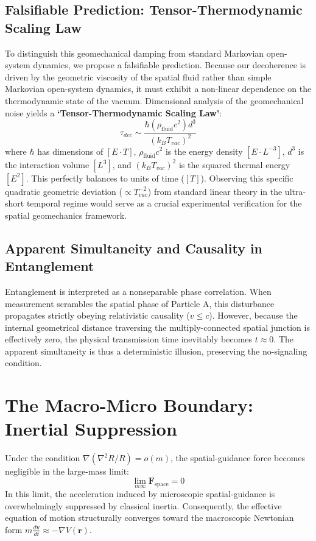 \documentclass[reprint,amsmath,amssymb,aps,prd]{revtex4-2}
\begin{document}
\subsection{Falsifiable Prediction: Tensor-Thermodynamic Scaling Law}
To distinguish this geomechanical damping from standard Markovian open-system dynamics, we propose a falsifiable prediction.
Because our decoherence is driven by the geometric viscosity of the spatial fluid rather than simple Markovian open-system dynamics, it must exhibit a non-linear dependence on the thermodynamic state of the vacuum.
Dimensional analysis of the geomechanical noise yields a \textbf{`Tensor-Thermodynamic Scaling Law'}:
\begin{equation}
\tau_{dec} \sim \frac{\hbar (\rho_{\mathrm{fluid}} c^2) d^3}{(k_B T_{vac})^2}
\end{equation}
where $\hbar$ has dimensions of $[E \cdot T]$, $\rho_{\mathrm{fluid}} c^2$ is the energy density $[E \cdot L^{-3}]$, $d^3$ is the interaction volume $[L^3]$, and $(k_B T_{vac})^2$ is the squared thermal energy $[E^2]$.
This perfectly balances to units of time ($[T]$). Observing this specific quadratic geometric deviation ($\propto T_{vac}^{-2}$) from standard linear theory in the ultra-short temporal regime would serve as a crucial experimental verification for the spatial geomechanics framework.
\subsection{Apparent Simultaneity and Causality in Entanglement}
Entanglement is interpreted as a nonseparable phase correlation.
When measurement scrambles the spatial phase of Particle A, this disturbance propagates strictly obeying relativistic causality ($v \le c$).
However, because the internal geometrical distance traversing the multiply-connected spatial junction is effectively zero, the physical transmission time inevitably becomes $t \approx 0$.
The apparent simultaneity is thus a deterministic illusion, preserving the no-signaling condition.
\section{The Macro-Micro Boundary: Inertial Suppression}
Under the condition $\nabla (\nabla^2 R/R) = o(m)$, the spatial-guidance force becomes negligible in the large-mass limit:
\begin{equation}
\lim_{m \infty} \mathbf{F}_{\mathrm{space}} = 0
\end{equation}
In this limit, the acceleration induced by microscopic spatial-guidance is overwhelmingly suppressed by classical inertia.
Consequently, the effective equation of motion structurally converges toward the macroscopic Newtonian form $m \frac{d\mathbf{v}}{dt} \approx -\nabla V(\mathbf{r})$.
\end{document}
